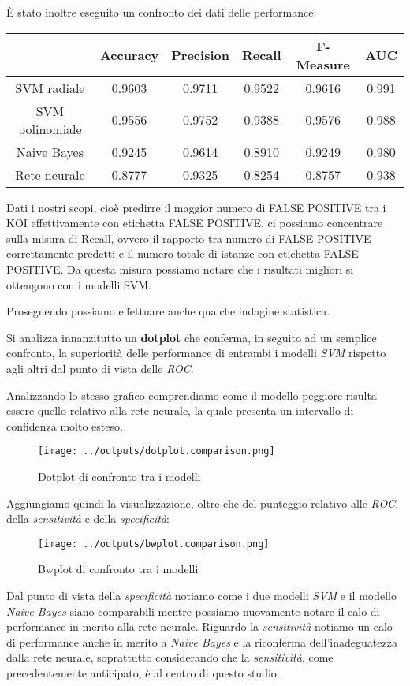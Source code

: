 È stato inoltre eseguito un confronto dei dati delle performance:
\begin{table}[H]
    \centering
    \begin{tabular}{|c|c|c|c|c|c|}
        \hline
         & Accuracy  & Precision & Recall & F-Measure & AUC \\
        \hline
        \hline
        SVM radiale & 0.9603 & 0.9711 & 0.9522 & 0.9616 & 0.991 \\
        SVM polinomiale & 0.9556 & 0.9752 & 0.9388 & 0.9576 & 0.988 \\
        Naive Bayes & 0.9245 & 0.9614 & 0.8910 & 0.9249 & 0.980 \\
        Rete neurale & 0.8777 & 0.9325 & 0.8254 & 0.8757 & 0.938 \\
        \hline
    \end{tabular}
\end{table}

Dati i nostri scopi, cioè predirre il maggior numero di FALSE POSITIVE tra 
i KOI effettivamente con etichetta FALSE POSITIVE, ci possiamo concentrare sulla
misura di Recall, ovvero il rapporto tra numero di FALSE POSITIVE correttamente 
predetti e il numero totale di istanze con etichetta FALSE POSITIVE. 
Da questa misura possiamo notare che i risultati migliori si ottengono con i 
modelli SVM.

Proseguendo possiamo effettuare anche qualche indagine statistica.

Si analizza innanzitutto un \textbf{dotplot} che conferma, in 
seguito ad un semplice confronto, la superiorità delle performance 
di entrambi i modelli \textit{SVM} rispetto agli altri dal punto 
di vista delle \textit{ROC}.

Analizzando lo stesso grafico comprendiamo come il modello 
peggiore risulta essere quello relativo alla rete neurale, la 
quale presenta un intervallo di confidenza molto esteso.

\begin{figure}[H]
    \centering
    \texttt{[image: ../outputs/dotplot.comparison.png]}
    \caption{Dotplot di confronto tra i modelli}
\end{figure}

Aggiungiamo quindi la visualizzazione, oltre che del punteggio relativo alle 
\textit{ROC}, della \textit{sensitività} e della \textit{specificità}:
\begin{figure}[H]
    \centering
    \texttt{[image: ../outputs/bwplot.comparison.png]}
    \caption{Bwplot di confronto tra i modelli}
\end{figure}
Dal punto di vista della \textit{specificità} notiamo come i due modelli 
\textit{SVM} e il modello \textit{Naive Bayes} siano comparabili mentre possiamo 
nuovamente notare il calo di performance in merito alla rete neurale. Riguardo
la \textit{sensitività} notiamo un calo di performance anche in merito a 
\textit{Naive Bayes} e la riconferma dell'inadeguatezza dalla rete neurale,
soprattutto considerando che la \textit{sensitività}, come precedentemente 
anticipato, è al centro di questo studio.

